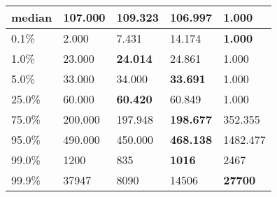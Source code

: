 \begin{table}[H]
\begin{tabular}{|l|m{10em}|m{10em}|m{10em}|m{10em}|}
\hline median & 107.000 & 109.323 & \bfseries 106.997 & \cellcolor[rgb]{0.9, 0.54, 0.52} 1.000 \\
\hline 0.1\% & 2.000 & 7.431 & \cellcolor[rgb]{0.9, 0.54, 0.52} 14.174 & \bfseries 1.000 \\
\hline 1.0\% & 23.000 & \bfseries 24.014 & 24.861 & \cellcolor[rgb]{0.9, 0.54, 0.52} 1.000 \\
\hline 5.0\% & 33.000 & 34.000 & \bfseries 33.691 & \cellcolor[rgb]{0.9, 0.54, 0.52} 1.000 \\
\hline 25.0\% & 60.000 & \bfseries 60.420 & 60.849 & \cellcolor[rgb]{0.9, 0.54, 0.52} 1.000 \\
\hline 75.0\% & 200.000 & 197.948 & \bfseries 198.677 & \cellcolor[rgb]{0.9, 0.54, 0.52} 352.355 \\
\hline 95.0\% & 490.000 & 450.000 & \bfseries 468.138 & \cellcolor[rgb]{0.9, 0.54, 0.52} 1482.477 \\
\hline 99.0\% & 1200 & 835 & \bfseries 1016 & \cellcolor[rgb]{0.9, 0.54, 0.52} 2467 \\
\hline 99.9\% & 37947 & \cellcolor[rgb]{0.9, 0.54, 0.52} 8090 & 14506 & \bfseries 27700 \\
\hline
\end{tabular}
\end{table}
